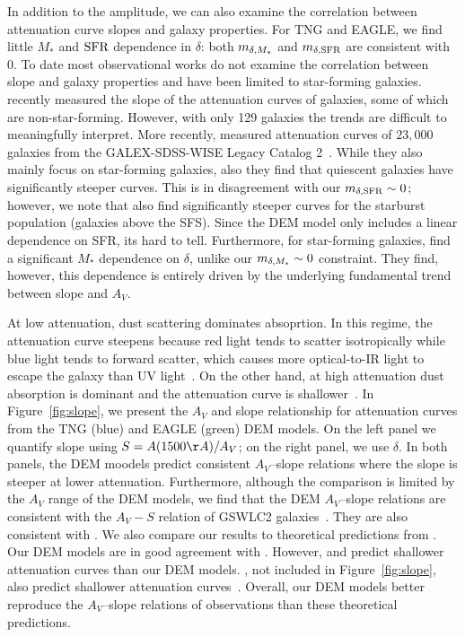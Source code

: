 In addition to the amplitude, we can also examine the correlation between
attenuation curve slopes and galaxy properties. For TNG and EAGLE, we find
little $M_*$ and ${\rm SFR}$ dependence in $\delta$: both $m_{\delta,M_*}$ and $m_{\delta,{\rm SFR}}$
are consistent with 0. To date most observational works do not examine the
correlation between slope and galaxy properties and have been limited to
star-forming galaxies. \cite{leja2017} recently measured the slope of the 
attenuation curves of galaxies, some of which are non-star-forming. However,
with only 129 galaxies the trends are difficult to meaningfully interpret.
More recently, \cite{salim2018} measured attenuation curves of $23,000$ 
galaxies from the GALEX-SDSS-WISE Legacy Catalog 2~\citep[GSWLC2;][]{salim2019}. While they
also mainly focus on star-forming galaxies, \cite{salim2018} also they find 
that quiescent galaxies have significantly steeper curves. This is in
disagreement with our $m_{\delta,{\rm SFR}}\sim0$; however, we note that \cite{salim2018} 
also find significantly steeper curves for the starburst population 
(galaxies above the SFS).
Since the DEM model only includes a linear dependence
on SFR, its hard to tell. Furthermore, for star-forming galaxies,
\cite{salim2018} find a significant $M_*$ dependence on $\delta$, unlike our
$m_{\delta,M_*}\sim0$ constraint. They find, however, this dependence is entirely
driven by the underlying fundamental trend between slope and $A_V$.

At low attenuation, dust scattering dominates absoprtion. In this regime,
the attenuation curve steepens because red light tends to
scatter isotropically while blue light tends to forward scatter, which causes
more optical-to-IR light to escape the galaxy than UV light~\citep{gordon1994,
witt2000, draine2003}. On the other hand, at high attenuation dust absorption 
is dominant and the attenuation curve is shallower~\citep{chevallard2013}.
In Figure~\ref{fig:slope}, we present the $A_V$ and slope relationship 
for attenuation curves from the TNG (blue) and EAGLE (green) DEM models. On the
left panel we quantify slope using $S = A(1500\AA)/A_V$; on the right
panel, we use $\delta$. In both panels, the DEM moodels predict consistent 
$A_V$--slope relations where the slope is steeper at lower 
attenuation. Furthermore, although the comparison is limited by the $A_V$ range
of the DEM models, we find that the DEM $A_V$--slope relations are consistent with 
the $A_V - S$ relation of GSWLC2 galaxies~\citep[black shaded][]{salim2020}.
They are also consistent with \cite{leja2017}. 
We also compare our results to theoretical predictions from \cite{witt2000,
inoue2005, chevallard2013}. Our DEM models are in good agreement with \cite{witt2000}.
However, \cite{inoue2005} and \cite{chevallard2013} predict shallower attenuation 
curves than our DEM models. \cite{narayanan2018}, not included in Figure~\ref{fig:slope}, 
also predict shallower attenuation curves~\citep{salim2020}. Overall, our DEM models 
better reproduce the $A_V$--slope relations of observations than these
theoretical predictions.

